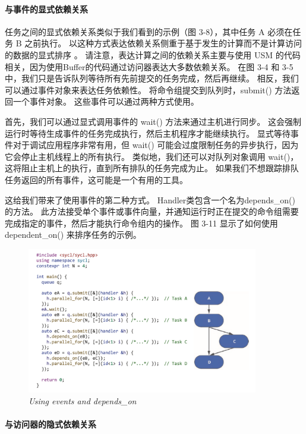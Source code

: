 \paragraph{与事件的显式依赖关系}

任务之间的显式依赖关系类似于我们看到的示例（图 3-8），其中任务 A 必须在任务 B 之前执行。
以这种方式表达依赖关系侧重于基于发生的计算而不是计算访问的数据的显式排序 。 
请注意，表达计算之间的依赖关系主要与使用 USM 的代码相关，因为使用Buffer的代码通过访问器表达大多数依赖关系。 
在图 3-4 和 3-5 中，我们只是告诉队列等待所有先前提交的任务完成，然后再继续。 
相反，我们可以通过事件对象来表达任务依赖性。 将命令组提交到队列时，submit() 方法返回一个事件对象。 
这些事件可以通过两种方式使用。

首先，我们可以通过显式调用事件的 wait() 方法来通过主机进行同步。 
这会强制运行时等待生成事件的任务完成执行，然后主机程序才能继续执行。 
显式等待事件对于调试应用程序非常有用，但 wait() 可能会过度限制任务的异步执行，因为它会停止主机线程上的所有执行。 
类似地，我们还可以对队列对象调用 wait()，这将阻止主机上的执行，直到所有排队的任务完成为止。 
如果我们不想跟踪排队任务返回的所有事件，这可能是一个有用的工具。

这给我们带来了使用事件的第二种方式。 Handler类包含一个名为depends\_on() 的方法。 
此方法接受单个事件或事件向量，并通知运行时正在提交的命令组需要完成指定的事件，然后才能执行命令组内的操作。 
图 3-11 显示了如何使用 dependent\_on() 来排序任务的示例。

\begin{figure}[H]
	\centering
	\includegraphics[width=0.9\textwidth]{figs/F3.11.png}
	\caption{\textit{Using events and depends\_on}}
\end{figure}

\paragraph{与访问器的隐式依赖关系}

